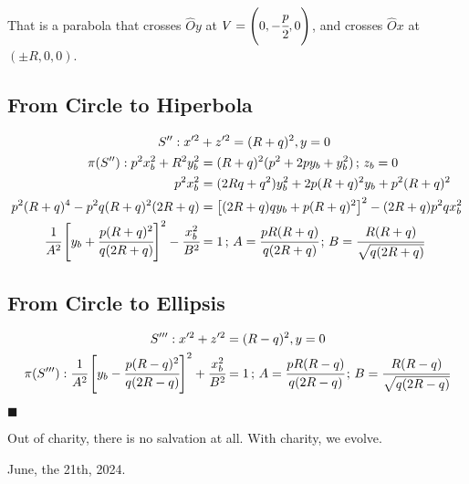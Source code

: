 \documentclass[12pt]{article}
\numberwithin{table}{section}
\begin{document}
That is a parabola that crosses $\hat O y$ at $V = \left(0, -\cfrac{p}{2}, 0\right)$, and crosses $\hat Ox$ at $(\pm R, 0, 0)$.

\subsection{From Circle to Hiperbola}

\begin{align}
S'': x'^2 &+ z'^2 = (R+q)^2, y = 0 \\
\pi(S''): p^2 x_b^2 + R^2 y_b^2 &= (R+q)^2 (p^2 + 2py_b +y_b^2)\,;\,z_b=0 \\
p^2x_b^2 &= (2Rq + q^2) y_b^2 + 2p(R+q)^2 y_b + p^2(R+q)^2\\
p^2(R+q)^4 - p^2q(R+q)^2(2R + q) &= \left[(2R + q)q y_b + p(R+q)^2\right]^2-(2R+q)p^2qx_b^2 \\
\cfrac{1}{A^2} \left[y_b+\cfrac{p(R+q)^2}{q(2R + q)}\right]^2-\cfrac{x_b^2}{B^2} &= 1\,;\,A = \cfrac{pR(R+q)}{q(2R+q)}\,;\,B = \cfrac{R(R+q)}{\sqrt{q(2R+q)}}
\end{align}

\subsection{From Circle to Ellipsis}

\begin{align}
S''': x'^2 + z'^2 &= (R-q)^2, y = 0 \\
\pi(S'''): \cfrac{1}{A^2} \left[y_b-\cfrac{p(R-q)^2}{q(2R - q)}\right]^2+\cfrac{x_b^2}{B^2} &= 1 \,;\,A = \cfrac{pR(R-q)}{q(2R-q)}\,;\,B = \cfrac{R(R-q)}{\sqrt{q(2R-q)}}
\end{align}

$\blacksquare$

Out of charity, there is no salvation at all. With charity, we evolve.

June, the 21th, 2024.

%
\end{document}

